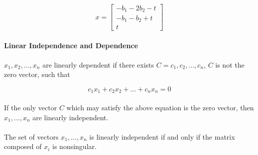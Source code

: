 \documentclass{article}
\begin{document}
\[
x = \begin{bmatrix}
    -b_1-2b_2-t\\-b_1-b_2+t\\t
\end{bmatrix}
\]
\paragraph{Linear Independence and Dependence}

\paragraph{}$x_1, x_2, \ldots, x_n$ are linearly dependent if there exists $C = c_1, c_2, \ldots, c_n$, $C$ is not the
zero vector, such that

\[
    c_1x_1 + c_2x_2 + \ldots + c_nx_n = 0
\]

\paragraph{}If the only vector $C$ which may satisfy the above equation is the zero vector, then $x_1, \ldots, x_n$ are 
linearly independent.

\paragraph{}The set of vectors $x_1,\ldots,x_n$ is linearly independent if and only if the matrix composed of $x_i$ is 
nonsingular.
\end{document}
